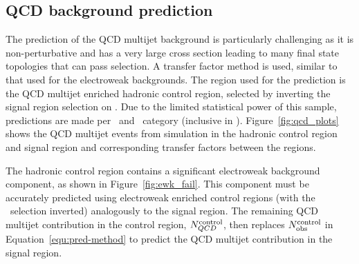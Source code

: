 \subsection{QCD background prediction}
\label{sec:qcd-pred}
The prediction of the QCD multijet background is particularly challenging
as it is non-perturbative and has a very large cross section leading to many 
final state topologies that can pass selection. A transfer factor method is used, similar to that used for the electroweak backgrounds. The region used for the prediction is the QCD multijet enriched hadronic control region, 
selected by inverting the signal region selection on \mhtmet. Due to the limited statistical
power of this sample, predictions are made per \njet~and \scalht~category (inclusive in \nb).
Figure~\ref{fig:qcd_plots} shows the QCD multijet events from simulation 
in the hadronic control region and signal region and corresponding transfer factors
between the regions.

The hadronic control region contains a significant electroweak background component, 
as shown in Figure~\ref{fig:ewk_fail}. This component must be accurately predicted
using electroweak enriched control regions (with the \mhtmet~selection inverted) analogously 
to the signal region. The remaining QCD multijet contribution in the control region,
$N_{QCD}^{\rm control}$, then replaces $N_{\textrm{obs}}^{\rm control}$ in Equation~\ref{equ:pred-method} 
to predict the QCD multijet contribution in the signal region. 

